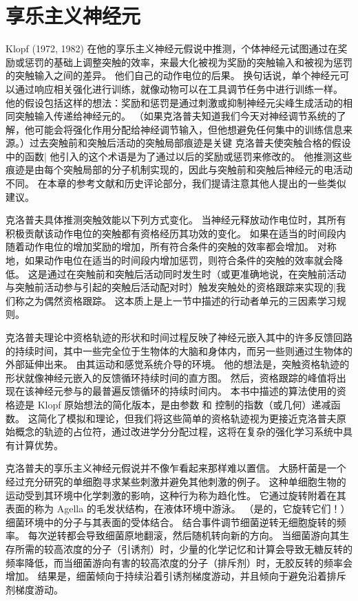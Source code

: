 \section{享乐主义神经元}


Klopf (1972, 1982) 在他的享乐主义神经元假说中推测，个体神经元试图通过在奖励或惩罚的基础上调整突触的效率，来最大化被视为奖励的突触输入和被视为惩罚的突触输入之间的差异。
他们自己的动作电位的后果。
换句话说，单个神经元可以通过响应相关强化进行训练，就像动物可以在工具调节任务中进行训练一样。
他的假设包括这样的想法：奖励和惩罚是通过刺激或抑制神经元尖峰生成活动的相同突触输入传递给神经元的。
（如果克洛普夫知道我们今天对神经调节系统的了解，他可能会将强化作用分配给神经调节输入，但他想避免任何集中的训练信息来源。）过去突触前和突触后活动的突触局部痕迹是关键 克洛普夫使突触合格的假设中的函数| 他引入的这个术语是为了通过以后的奖励或惩罚来修改的。
他推测这些痕迹是由每个突触局部的分子机制实现的，因此与突触前和突触后神经元的电活动不同。
在本章的参考文献和历史评论部分，我们提请注意其他人提出的一些类似建议。


克洛普夫具体推测突触效能以下列方式变化。
当神经元释放动作电位时，其所有积极贡献该动作电位的突触都有资格经历其功效的变化。
如果在适当的时间段内随着动作电位的增加奖励的增加，所有符合条件的突触的效率都会增加。
对称地，如果动作电位在适当的时间段内增加惩罚，则符合条件的突触的效率就会降低。
这是通过在突触前和突触后活动同时发生时（或更准确地说，在突触前活动与突触前活动参与引起的突触后活动配对时）触发突触处的资格跟踪来实现的|我们称之为偶然资格跟踪。
这本质上是上一节中描述的行动者单元的三因素学习规则。


克洛普夫理论中资格轨迹的形状和时间过程反映了神经元嵌入其中的许多反馈回路的持续时间，其中一些完全位于生物体的大脑和身体内，而另一些则通过生物体的外部延伸出来。
由其运动和感觉系统介导的环境。 他的想法是，突触资格轨迹的形状就像神经元嵌入的反馈循环持续时间的直方图。
然后，资格跟踪的峰值将出现在该神经元参与的最普遍反馈循环的持续时间内。
本书中描述的算法使用的资格迹是 Klopf 原始想法的简化版本，是由参数 和 控制的指数（或几何）递减函数。
这简化了模拟和理论，但我们将这些简单的资格轨迹视为更接近克洛普夫原始概念的轨迹的占位符，通过改进学分分配过程，这将在复杂的强化学习系统中具有计算优势。


克洛普夫的享乐主义神经元假说并不像乍看起来那样难以置信。
大肠杆菌是一个经过充分研究的单细胞寻求某些刺激并避免其他刺激的例子。
这种单细胞生物的运动受到其环境中化学刺激的影响，这种行为称为趋化性。
它通过旋转附着在其表面的称为 Agella 的毛发状结构，在液体环境中游泳。 （是的，它旋转它们！）细菌环境中的分子与其表面的受体结合。
结合事件调节细菌逆转无细胞旋转的频率。
每次逆转都会导致细菌原地翻滚，然后随机转向新的方向。
当细菌游向其生存所需的较高浓度的分子（引诱剂）时，少量的化学记忆和计算会导致无糖反转的频率降低，而当细菌游向有害的较高浓度的分子（排斥剂）时，无胶反转的频率会增加。
结果是，细菌倾向于持续沿着引诱剂梯度游动，并且倾向于避免沿着排斥剂梯度游动。


